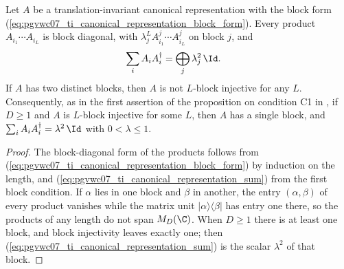 \begin{lemma}
    \label{lem:pgvwc07_ti_canonical_representation_single_block}
    \leanok
    Let $A$ be a translation-invariant canonical representation with the
    block form (\ref{eq:pgvwc07_ti_canonical_representation_block_form}).
    Every product $A_{i_1}\cdots A_{i_L}$ is block diagonal, with
    $\lambda_j^LA^j_{i_1}\cdots A^j_{i_L}$ on block $j$, and
    \begin{align}
        \sum_iA_iA_i^\dagger & =\bigoplus_j\lambda_j^2\,\Id.
        \label{eq:pgvwc07_ti_canonical_representation_sum}
    \end{align}
    If $A$ has two distinct blocks, then $A$ is not $L$-block injective for
    any $L$. Consequently, as in the first assertion of the proposition on condition C1 in
    \cite{PerezGarcia2007Matrix}, if $D\ge1$ and $A$ is $L$-block injective for
    some $L$, then $A$ has a single block, and
    $\sum_iA_iA_i^\dagger=\lambda^2\,\Id$ with $0<\lambda\le1$.
\end{lemma}

\begin{proof}
    \leanok
    The block-diagonal form of the products follows from
    (\ref{eq:pgvwc07_ti_canonical_representation_block_form}) by induction
    on the length, and (\ref{eq:pgvwc07_ti_canonical_representation_sum})
    from the first block condition. If $\alpha$ lies in one block and
    $\beta$ in another, the entry $(\alpha,\beta)$ of every product
    vanishes while the matrix unit $\lvert\alpha\rangle\langle\beta\rvert$
    has entry one there, so the products of any length do not span
    $M_D(\C)$. When $D\ge1$ there is at least one block, and block
    injectivity leaves exactly one; then
    (\ref{eq:pgvwc07_ti_canonical_representation_sum}) is the scalar
    $\lambda^2$ of that block.
\end{proof}


